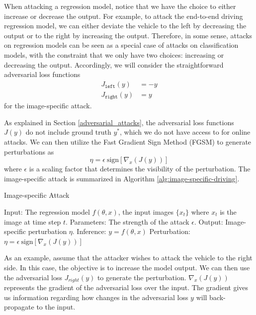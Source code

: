 When attacking a regression model, notice that we have the choice to either increase or decrease the output. For example, to attack the end-to-end driving regression model, we can either deviate the vehicle to the left by decreasing the output or to the right by increasing the output. Therefore, in some sense, attacks on regression models can be seen as a special case of attacks on classification models, with the constraint that we only have two choices: increasing or decreasing the output. Accordingly, we will consider the straightforward adversarial loss functions 
\begin{align}
    J_{\texttt{left}}(y) &= -y \\
    J_{\texttt{right}}(y) &= y
\end{align}
for the image-specific attack. 

As explained in Section \ref{adversarial_attacks}, the adversarial loss functions $J(y)$ do not include ground truth $y^{*}$, which we do not have access to for online attacks. We can then utilize the Fast Gradient Sign Method (FGSM) to generate perturbations as 
\begin{equation}
    \eta = \epsilon \ \text{sign}[\nabla_{x}( J(y))]
\end{equation}
where $\epsilon$ is a scaling factor that determines the visibility of the perturbation. The image-specific attack is summarized in Algorithm \ref{alg:image-specific-driving}.

\begin{algorithm}[t]
    \caption{Image-specific Attack}\label{alg:image-specific-driving}
    \begin{algorithmic}
        \State Input: The regression model $f(\theta, x)$, the input images $\{x_t\}$ where $x_t$ is the image at time step $t$.
        \State Parameters: The strength of the attack $\epsilon$.
        \State Output: Image-specific perturbation $\eta$.
            \State Inference: $y = f(\theta, x)$
            \State Perturbation: $\eta = \epsilon \ \text{sign}[\nabla_{x}( J(y))]$
        \EndFor
    \end{algorithmic}
\end{algorithm}

As an example, assume that the attacker wishes to attack the vehicle to the right side. In this case, the objective is to increase the model output. We can then use the adversarial loss $J_{right}(y)$ to generate the perturbation. $\nabla_{x}( J(y))$ represents the gradient of the adversarial loss over the input. The gradient gives us information regarding how changes in the adversarial loss $y$ will back-propagate to the input.

